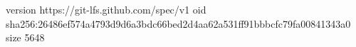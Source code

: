 version https://git-lfs.github.com/spec/v1
oid sha256:26486ef574a4793d9d6a3bdc66bed2d4aa62a531ff91bbbcfc79fa00841343a0
size 5648
